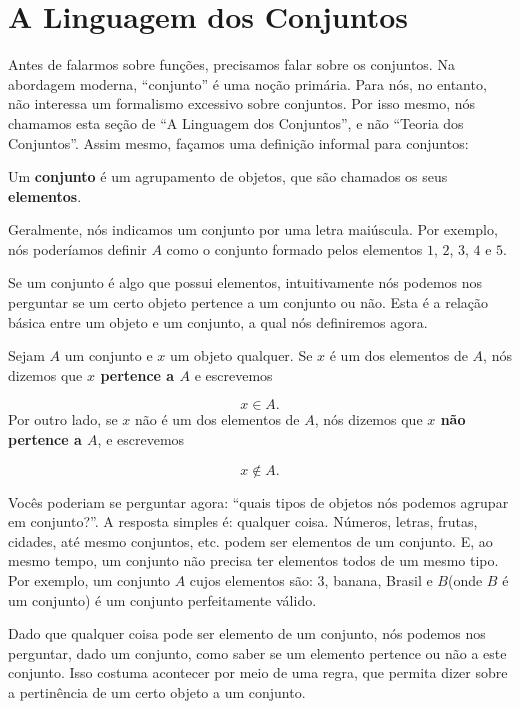 \section{A Linguagem dos Conjuntos}

Antes de falarmos sobre funções, precisamos falar sobre os conjuntos. Na abordagem moderna, ``conjunto'' é uma noção primária. Para nós, no entanto, não interessa um formalismo excessivo sobre conjuntos. Por isso mesmo, nós chamamos esta seção de ``A Linguagem dos Conjuntos'', e não ``Teoria dos Conjuntos''. Assim mesmo, façamos uma definição informal para conjuntos:

\begin{Definition}
	Um \textbf{conjunto} é um agrupamento de objetos, que são chamados os seus \textbf{elementos}.
\end{Definition}

Geralmente, nós indicamos um conjunto por uma letra maiúscula. Por exemplo, nós poderíamos definir $A$ como o conjunto formado pelos elementos $1$, $2$, $3$, $4$ e $5$.

Se um conjunto é algo que possui elementos, intuitivamente nós podemos nos perguntar se um certo objeto pertence a um conjunto ou não. Esta é a relação básica entre um objeto e um conjunto, a qual nós definiremos agora.

\begin{Definition}[Pertinência]
	Sejam $A$ um conjunto e $x$ um objeto qualquer. Se $x$ é um dos elementos de $A$, nós dizemos que \textbf{$x$ pertence a $A$} e escrevemos
	
	$$
	x\in A.
	$$
	Por outro lado, se $x$ não é um dos elementos de $A$, nós dizemos que \textbf{$x$ não pertence a $A$}, e escrevemos
	
	$$
	x\notin A.
	$$
\end{Definition}

Vocês poderiam se perguntar agora: ``quais tipos de objetos nós podemos agrupar em conjunto?''. A resposta simples é: qualquer coisa. Números, letras, frutas, cidades, até mesmo conjuntos, etc. podem ser elementos de um conjunto. E, ao mesmo tempo, um conjunto não precisa ter elementos todos de um mesmo tipo. Por exemplo, um conjunto $A$ cujos elementos são: $3$, banana, Brasil e $B$(onde $B$ é um conjunto) é um conjunto perfeitamente válido.

Dado que qualquer coisa pode ser elemento de um conjunto, nós podemos nos perguntar, dado um conjunto, como saber se um elemento pertence ou não a este conjunto. Isso costuma acontecer por meio de uma regra, que permita dizer sobre a pertinência de um certo objeto a um conjunto.

